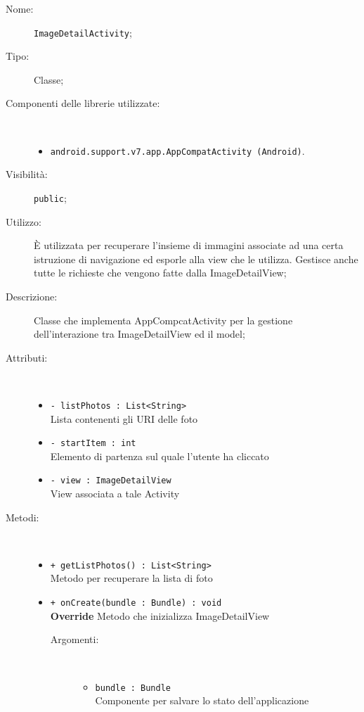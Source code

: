 \documentclass[../DefinizioneDiProdotto.tex]{subfiles}
\begin{document}
\begin{description}
	\item[Nome:] \texttt{ImageDetailActivity};
	\item[Tipo:] Classe;
	\item[Componenti delle librerie utilizzate:] \
	\begin{itemize}
		\item \texttt{android.support.v7.app.AppCompatActivity (Android)}.
		
	\end{itemize}
	\item[Visibilità:] \texttt{public};
	\item[Utilizzo:] È utilizzata per recuperare l'insieme di immagini associate ad una certa istruzione di navigazione ed esporle alla view che le utilizza. Gestisce anche tutte le richieste che vengono fatte dalla ImageDetailView;
	\item[Descrizione:] Classe che implementa AppCompcatActivity per la gestione dell'interazione tra ImageDetailView ed il model;
	\item[Attributi:] \
	\begin{itemize}
		\item \texttt{- listPhotos : List<String>}\\
		Lista contenenti gli URI delle foto
		
		\item \texttt{- startItem : int}\\
		Elemento di partenza sul quale l'utente ha cliccato
		
		\item \texttt{- view : ImageDetailView}\\
		View associata a tale Activity
		
	\end{itemize}
	\item[Metodi:] \
	\begin{itemize}
		\item \texttt{+ getListPhotos() : List<String>}\\
		Metodo per recuperare la lista di foto
		\item \texttt{+ onCreate(bundle : Bundle) : void}\\
		\textbf{Override} Metodo che inizializza ImageDetailView
		\begin{description}
			\item[Argomenti:] \
			\begin{itemize}
				\item \texttt{bundle : Bundle}\\
				Componente per salvare lo stato dell'applicazione\end{itemize}
		\end{description}
	\end{itemize}
\end{description}
\end{document}
